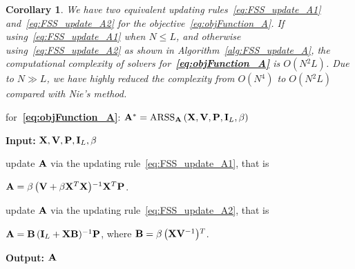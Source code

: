 \documentclass[a4paper]{article}
\newtheorem{corollary}[theorem]{Corollary}     %
\begin{document}
\begin{corollary} \label{corollary:ARSS_complexity_A} We have two
equivalent updating rules\ \eqref{eq:FSS_update_A1} and\ \eqref{eq:FSS_update_A2}
for the objective\ \eqref{eq:objFunction_A}. If using\ \eqref{eq:FSS_update_A1}
when $N\!\leq\! L$, and otherwise using\ \eqref{eq:FSS_update_A2}
as shown in Algorithm\ \ref{alg:FSS_update_A}, the computational
complexity of solvers for\ \textbf{\eqref{eq:objFunction_A}} is
$O\left(N{}^{2}L\right)$. Due to $N\gg L$, we have highly reduced
the complexity from $O\left(N{}^{4}\right)$ to $O\left(N{}^{2}L\right)$
compared with Nie's method. \end{corollary} 
\begin{algorithm}[t]
\caption{ for\textbf{\ \eqref{eq:objFunction_A}}: $\mathbf{A}^{*}=\text{ARSS}_{\mathbf{A}}\left(\mathbf{X},\mathbf{V},\mathbf{P},\mathbf{I}_{L},\beta\right)$\textbf{
\label{alg:FSS_update_A}}}
 \textbf{Input:} $\mathbf{X},\mathbf{V},\mathbf{P},\mathbf{I}_{L},\beta$

\begin{algorithmic}[1] 


\STATE update $\mathbf{A}$ via the updating rule\ \eqref{eq:FSS_update_A1},
that is

\STATE $\mathbf{A}=\beta\left(\mathbf{V}+\beta\mathbf{X}^{T}\mathbf{X}\right)\!{}^{-1}\mathbf{X}^{T}\mathbf{P}$.


\STATE update $\mathbf{A}$ via the updating rule\ \eqref{eq:FSS_update_A2},
that is

\STATE $\mathbf{A}=\mathbf{B}\left(\mathbf{I}_{L}+\mathbf{X}\mathbf{B}\right)\!{}^{-1}\mathbf{P}$,
where $\mathbf{B}=\beta\left(\mathbf{X}\mathbf{V}^{-1}\right)\!{}^{T}$. 

\ENDIF 

\end{algorithmic} 

\textbf{Output: $\mathbf{A}$}
\end{algorithm}
 
\end{document}
